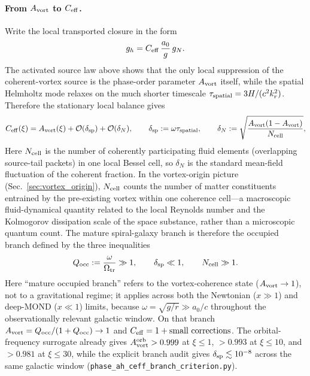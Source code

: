 \documentclass[11pt]{article}
\begin{document}
\paragraph{From $A_{\rm vort}$ to $C_{\rm eff}$.}
Write the local transported closure in the form
\[
g_h = C_{\rm eff}\,\frac{a_0}{g}\,g_N.
\]
The activated source law above shows that the only local suppression of the
coherent-vortex source is the phase-order parameter $A_{\rm vort}$ itself,
while the spatial Helmholtz mode relaxes on the much shorter timescale
$\tau_{\rm spatial}=3H/(c^2 k_r^2)$.  Therefore the stationary local balance
gives
\begin{equation}
C_{\rm eff}(\xi)=A_{\rm vort}(\xi)+\mathcal{O}(\delta_{\rm sp})
+\mathcal{O}(\delta_N),
\qquad
\delta_{\rm sp}:=\omega\tau_{\rm spatial},
\qquad
\delta_N:=\sqrt{\frac{A_{\rm vort}(1-A_{\rm vort})}{N_{\rm cell}}},
\label{eq:ceff_from_activation}
\end{equation}
Here $N_{\rm cell}$ is the number of coherently participating fluid
elements (overlapping source-tail packets) in one local Bessel cell,
so $\delta_N$ is the standard mean-field fluctuation of the coherent
fraction.  In the vortex-origin picture
(Sec.~\ref{sec:vortex_origin}), $N_{\rm cell}$ counts the number of
matter constituents entrained by the pre-existing vortex within one
coherence cell---a macroscopic fluid-dynamical quantity related to
the local Reynolds number and the Kolmogorov dissipation scale of
the space substance, rather than a microscopic quantum count.
The mature spiral-galaxy branch is therefore the occupied
branch defined by the three inequalities
\[
Q_{\rm occ}:=\frac{\omega}{\Omega_{\rm tr}}\gg1,\qquad
\delta_{\rm sp}\ll1,\qquad
N_{\rm cell}\gg1.
\]
Here ``mature occupied branch'' refers to the vortex-coherence state
($A_{\rm vort}\to 1$), not to a gravitational regime; it applies across
both the Newtonian ($x\gg 1$) and deep-MOND ($x\ll 1$) limits, because
$\omega=\sqrt{g/r}\gg a_0/c$ throughout the observationally relevant
galactic window.
On that branch $A_{\rm vort}=Q_{\rm occ}/(1+Q_{\rm occ})\to1$ and
$C_{\rm eff}=1+\text{small corrections}$.  The orbital-frequency surrogate
already gives $A_{\rm vort}^{\rm orb}>0.999$ at $\xi\le1$, $>0.993$ at
$\xi\le10$, and $>0.981$ at $\xi\le30$, while the explicit branch audit gives
$\delta_{\rm sp}\lesssim10^{-8}$ across the same galactic window
(\nolinkurl{phase_ah_ceff_branch_criterion.py}).
\end{document}
